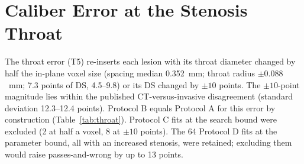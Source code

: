 \documentclass[journal,twoside,web,onecolumn]{ieeecolor}
\begin{document}
\section{Caliber Error at the Stenosis Throat}\label{sec:throat}
The throat error (T5) re-inserts each lesion with its throat diameter changed by half the in-plane voxel size
(spacing median 0.352~mm; throat radius $\pm 0.088$~mm; 7.3 points of DS, 4.5--9.8) or its DS changed by $\pm 10$ points. The $\pm 10$-point magnitude lies within the published CT-versus-invasive disagreement (standard deviation 12.3--12.4 points). Protocol B equals
Protocol A for this error by construction (Table~\ref{tab:throat}). Protocol C fits at the search bound were excluded
(2 at half a voxel, 8 at $\pm 10$ points). The 64 Protocol D fits at the parameter bound, all with an increased
stenosis, were retained; excluding them would raise passes-and-wrong by up to 13 points.
\end{document}
